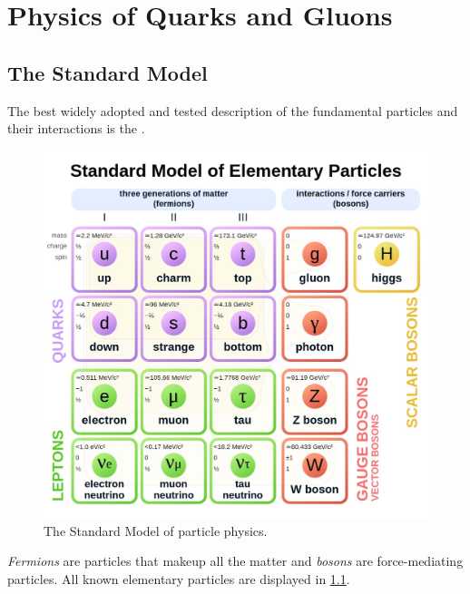 \chapter{Physics of Quarks and Gluons}
\label{ch:physics}
\section{The Standard Model}
\label{sec:sm}
The best widely adopted and tested description of the fundamental particles and their interactions is the \SM \cite{pdg}. 
\begin{figure}[htb]
    \centering
    \includegraphics[width=0.6\linewidth]{src/img/sm.jpg}
    \caption[The Standard Model of particle physics.]{The Standard Model of particle physics. \footnotemark}
    \label{fig:sm}
\end{figure}
\emph{Fermions} are particles that makeup all the matter and \emph{bosons} are force-mediating particles.
All known elementary particles are displayed in \cref{fig:sm}.

